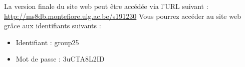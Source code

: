 La version finale du site web peut être accédée via l'URL suivant : \href{http://ms8db.montefiore.ulg.ac.be/s191230}{http://ms8db.montefiore.ulg.ac.be/s191230}
Vous pourrez accéder au site web grâce aux identifiants suivants :
\begin{itemize}
  \item Identifiant : group25
  \item Mot de passe : 3uCTA8L2ID
\end{itemize}